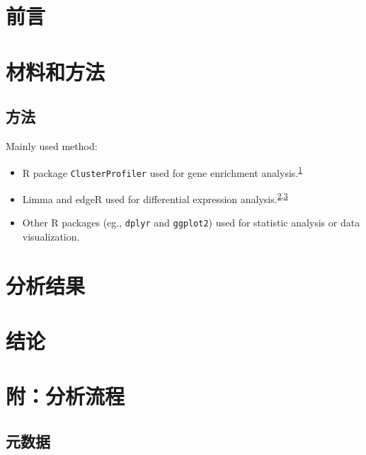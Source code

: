 \documentclass[
]{article}
\providecommand{\tightlist}{%
  \setlength{\itemsep}{0pt}\setlength{\parskip}{0pt}}
\begin{document}
\hypertarget{introduction}{%
\section{前言}\label{introduction}}

\hypertarget{methods}{%
\section{材料和方法}\label{methods}}

\hypertarget{ux65b9ux6cd5}{%
\subsection{方法}\label{ux65b9ux6cd5}}

Mainly used method:

\begin{itemize}
\tightlist
\item
  R package \texttt{ClusterProfiler} used for gene enrichment analysis.\textsuperscript{\protect\hyperlink{ref-ClusterprofilerWuTi2021}{1}}
\item
  Limma and edgeR used for differential expression analysis.\textsuperscript{\protect\hyperlink{ref-LimmaPowersDiRitchi2015}{2},\protect\hyperlink{ref-EdgerDifferenChen}{3}}
\item
  Other R packages (eg., \texttt{dplyr} and \texttt{ggplot2}) used for statistic analysis or data visualization.
\end{itemize}

\hypertarget{results}{%
\section{分析结果}\label{results}}

\hypertarget{dis}{%
\section{结论}\label{dis}}

\hypertarget{workflow}{%
\section{附：分析流程}\label{workflow}}

\hypertarget{ux5143ux6570ux636e}{%
\subsection{元数据}\label{ux5143ux6570ux636e}}
\end{document}

